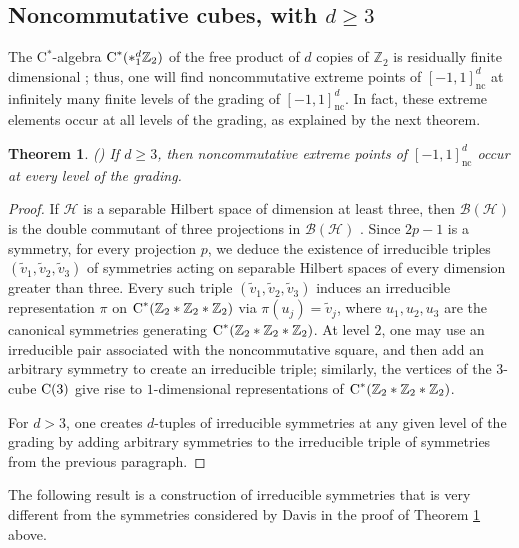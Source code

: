 \documentclass{amsart}
\newtheorem{theorem}{Theorem}[section]
\theoremstyle{definition}
\theoremstyle{remark}
\newcommand{\B}{\mathcal{B}}
\renewcommand{\H}{\mathcal{H}}
\newcommand\cstar{{\textrm C}^*}                              %
\numberwithin{equation}{section}
\begin{document}
 \subsection{Noncommutative cubes, with $d\geq3$}
 
The C$^*$-algebra $\cstar(*_1^d\mathbb Z_2 )$ of the free product of $d$ copies of $\mathbb Z_2$
is residually finite dimensional \cite{bedos_omland2011}; thus, one will find noncommutative extreme points of $[-1,1]^d_{\textrm{nc}}$ at infinitely many 
finite levels of the grading of $[-1,1]^d_{\textrm{nc}}$. In fact, these extreme elements occur at all levels of the grading, as explained by the next theorem.
 
\begin{theorem}\label{ncd levels}{\textrm (\cite{davis1955,evert--helton--klep--mccullough2018,kriel2019})}
If $d\geq3$, then noncommutative extreme points of $[-1,1]^d_{\textrm{nc}}$ occur at every level of the
grading.
\end{theorem}

\begin{proof}
If $\H$ is a separable Hilbert space of dimension at least three, then $\B(\H)$ is the double commutant of three projections in $\B(\H)$ \cite{davis1955}.
Since $2p-1$ is a symmetry, for every projection $p$, we deduce the existence of irreducible triples $(\tilde v_1,\tilde v_2,\tilde v_3)$ of symmetries acting on separable
Hilbert spaces of every dimension greater than three. Every such triple $(\tilde v_1,\tilde v_2,\tilde v_3)$ induces an irreducible representation $\pi$ on 
$\cstar(\mathbb Z_2*\mathbb Z_2*\mathbb Z_2)$ via $\pi(u_j)=\tilde v_j$, where $u_1,u_2,u_3$ are the canonical 
symmetries generating $\cstar(\mathbb Z_2*\mathbb Z_2*\mathbb Z_2)$. At level $2$, one may use an irreducible pair associated with the noncommutative square,
and then add an arbitrary symmetry to create an irreducible triple; similarly, the vertices of the $3$-cube $\mbox{\textrm C}(3)$
give rise to $1$-dimensional representations of  $\cstar(\mathbb Z_2*\mathbb Z_2*\mathbb Z_2)$.

For $d>3$, one creates $d$-tuples of irreducible symmetries at any given level of the grading 
by adding arbitrary symmetries to the irreducible triple of symmetries from the previous paragraph.
\end{proof}

The following result is a construction of irreducible symmetries that is very different from the symmetries considered by Davis \cite{davis1955} in the proof of Theorem \ref{ncd levels}
above. 
\end{document}
